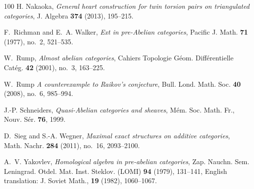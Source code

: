 \documentclass[a4paper,10pt,reqno]{amsart}
\begin{document}
\begin{thebibliography}{100}
		H. Nakaoka, \emph{General heart construction for twin torsion pairs on triangulated categories}, J. Algebra \textbf{374} (2013),
		195--215.
		
		F.~Richman and E.~A. Walker, \emph{Ext in pre-{A}belian categories}, Pacific J.
		Math. \textbf{71} (1977), no.~2, 521--535.
		
		W.~Rump, \emph{Almost abelian categories}, Cahiers Topologie G\'eom.
		Diff\'erentielle Cat\'eg. \textbf{42} (2001), no.~3, 163--225.
		
		W.~Rump \emph{A counterexample to {R}aikov's conjecture}, Bull. Lond. Math.
		Soc. \textbf{40} (2008), no.~6, 985--994.
		
		J.-P. Schneiders, \emph{Quasi-{A}belian categories and sheaves}, M\'{e}m. Soc.
		Math. Fr., Nouv. S\'{e}r. \textbf{76}, 1999.
		
		D.~Sieg and S.-A. Wegner, \emph{Maximal exact structures on additive
			categories}, Math. Nachr. \textbf{284} (2011), no.~16, 2093--2100.
		
		A.~V. Yakovlev, \emph{Homological algebra in pre-abelian categories}, Zap.
		Nauchn. Sem. Leningrad. Otdel. Mat. Inst. Steklov. (LOMI) \textbf{94} (1979),
		131--141, English translation: J. Soviet Math., \textbf{19} (1982), 1060--1067.
		
		
	\end{thebibliography}
	
\end{document}

